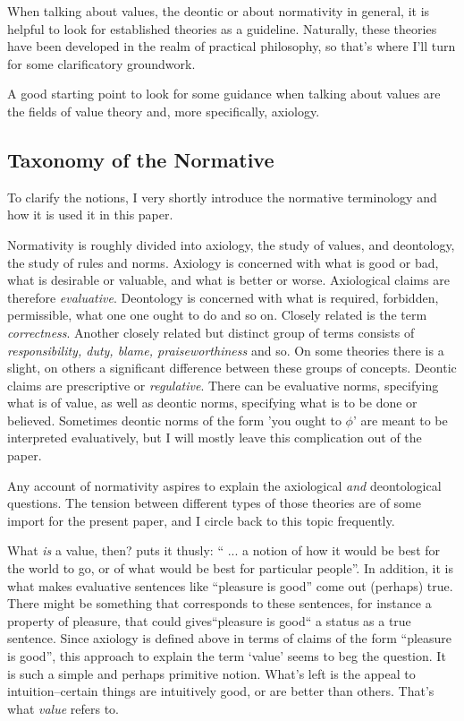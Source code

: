 \documentclass[12pt,numbers=noenddot]{scrartcl}
\begin{document}
When talking about values, the deontic or about normativity in general, it is helpful to look for established theories as a guideline. Naturally, these theories have been developed in the realm of practical philosophy, so that's where I'll turn for some clarificatory groundwork.

A good starting point to look for some guidance when talking about values are the fields of value theory and, more specifically, axiology.

\subsection{ Taxonomy of the Normative}

To clarify the notions, I very shortly introduce the normative terminology and how it is used it in this paper.

Normativity is roughly divided into axiology, the study of values, and deontology, the study of rules and norms. Axiology is concerned with what is good or bad, what is desirable or valuable, and what is better or worse. Axiological claims are therefore \emph{evaluative}. Deontology is concerned with what is required, forbidden, permissible, what one one ought to do and so on. Closely related is the term \emph{correctness}. Another closely related but distinct group of terms consists of \emph{responsibility, duty, blame, praiseworthiness} and so. On some theories there is a slight, on others a significant difference between these groups of concepts. Deontic claims are prescriptive or \emph{regulative}. There can be evaluative norms, specifying what is of value, as well as deontic norms, specifying what is to be done or believed. Sometimes deontic norms of the form 'you ought to $\phi$' are meant to be interpreted evaluatively, but I will mostly leave this complication out of the paper.

Any account of normativity aspires to explain the axiological \emph{and} deontological questions. The tension between different types of those theories are of some import for the present paper, and I circle back to this topic frequently.

What \emph{is} a value, then? \textcite[79]{scanlon1998} puts it thusly: “ ... a notion of how it would be best for the world to go, or of what would be best for particular people”. In addition, it is what makes evaluative sentences like “pleasure is good” come out (perhaps) true. There might be something that corresponds to these sentences, for instance a property of pleasure, that could gives“pleasure is good“ a status as a true sentence. Since axiology is defined above in terms of claims of the form “pleasure is good”, this approach to explain the term ‘value’ seems to beg the question. It is such a simple and perhaps primitive notion. What's left is the appeal to intuition–certain things are intuitively good, or are better than others. That's what \emph{value} refers to.
\end{document}
